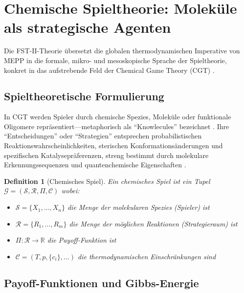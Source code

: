 \documentclass[12pt,a4paper]{article}
\newtheorem{definition}{Definition}
\theoremstyle{remark}
\begin{document}
\section{Chemische Spieltheorie: Molek\"ule als strategische Agenten}
\label{sec:cgt}

Die FST-II-Theorie \"ubersetzt die globalen thermodynamischen Imperative von MEPP in die formale, mikro- und mesoskopische Sprache der Spieltheorie, konkret in das aufstrebende Feld der Chemical Game Theory (CGT) \citep{CGT2018,CGTMacmillan}.

\subsection{Spieltheoretische Formulierung}

In CGT werden Spieler durch chemische Spezies, Molek\"ule oder funktionale Oligomere repr\"asentiert---metaphorisch als ``Knowlecules'' bezeichnet \citep{CGT2018}. Ihre ``Entscheidungen'' oder ``Strategien'' entsprechen probabilistischen Reaktionswahrscheinlichkeiten, sterischen Konformations\"anderungen und spezifischen Katalysepr\"aferenzen, streng bestimmt durch molekulare Erkennungssequenzen und quantenchemische Eigenschaften \citep{ThermodynamicSelection}.

\begin{definition}[Chemisches Spiel]
Ein chemisches Spiel ist ein Tupel $\mathcal{G} = (\mathcal{S}, \mathcal{R}, \Pi, \mathcal{C})$ wobei:
\begin{itemize}
    \item $\mathcal{S} = \{X_1, \ldots, X_n\}$ die Menge der molekularen Spezies (Spieler) ist
    \item $\mathcal{R} = \{R_1, \ldots, R_m\}$ die Menge der m\"oglichen Reaktionen (Strategieraum) ist
    \item $\Pi: \mathcal{R} \to \mathbb{R}$ die Payoff-Funktion ist
    \item $\mathcal{C} = (T, p, \{c_i\}, \ldots)$ die thermodynamischen Einschr\"ankungen sind
\end{itemize}
\end{definition}

\subsection{Payoff-Funktionen und Gibbs-Energie}
\end{document}
